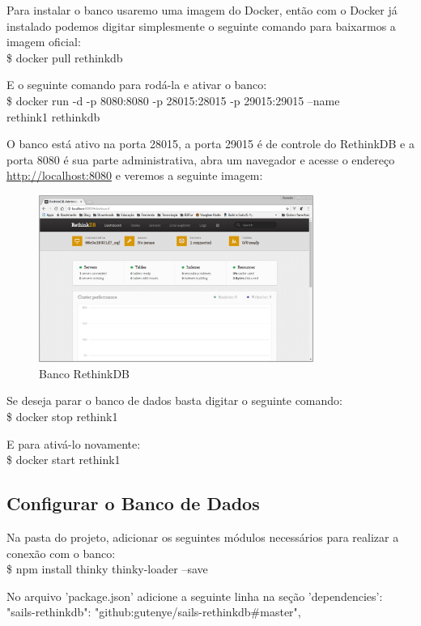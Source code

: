 \documentclass[a4paper,11pt]{article}
\begin{document}
Para instalar o banco usaremo uma imagem do Docker, então com o Docker já instalado podemos digitar simplesmente o seguinte comando para baixarmos a imagem oficial: \\
{\ttfamily\$ docker pull rethinkdb}

E o seguinte comando para rodá-la e ativar o banco: \\
{\ttfamily\$ docker run -d -p 8080:8080 -p 28015:28015 -p 29015:29015 --name } \\
{\ttfamily rethink1 rethinkdb}

O banco está ativo na porta 28015, a porta 29015 é de controle do RethinkDB e a porta
8080 é sua parte administrativa, abra um navegador e acesse o endereço 
\url{http://localhost:8080} e veremos a seguinte imagem:
\begin{figure}[H]
	\centering
	\includegraphics[width=0.8\textwidth]{imagens/Rethinkdb.png}
	\caption{Banco RethinkDB}
\end{figure}

Se deseja parar o banco de dados basta digitar o seguinte comando: \\
{\ttfamily\$ docker stop rethink1}

E para ativá-lo novamente: \\
{\ttfamily\$ docker start rethink1}

\subsection{Configurar o Banco de Dados}
Na pasta do projeto, adicionar os seguintes módulos necessários para realizar a conexão com o banco: \\
{\ttfamily\$ npm install thinky thinky-loader --save}

No arquivo 'package.json' adicione a seguinte linha na seção 'dependencies': \\
{\ttfamily "sails-rethinkdb": "github:gutenye/sails-rethinkdb\#master",}
\end{document}
